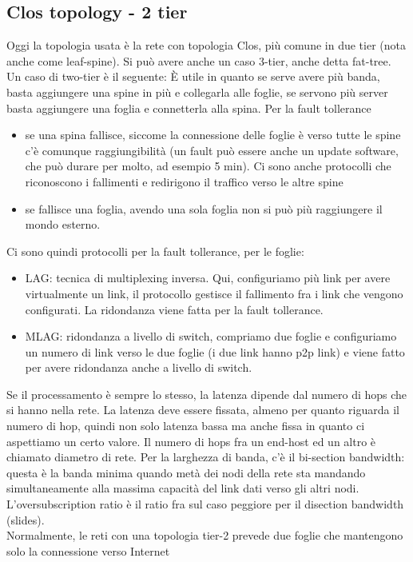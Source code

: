 \documentclass[12pt, oneside]{extbook} %
\begin{document}
\subsection{Clos topology - 2 tier}
Oggi la topologia usata è la rete con topologia Clos, più comune in due tier (nota anche come leaf-spine). Si può avere anche un caso 3-tier, anche detta fat-tree.\\Un caso di two-tier è il seguente:
È utile in quanto se serve avere più banda, basta aggiungere una spine in più e collegarla alle foglie, se servono più server basta aggiungere una foglia e connetterla alla spina. Per la fault tollerance
\begin{itemize}
\item se una spina fallisce, siccome la connessione delle foglie è verso tutte le spine c'è comunque raggiungibilità (un fault può essere anche un update software, che può durare per molto, ad esempio 5 min). Ci sono anche protocolli che riconoscono i fallimenti e redirigono il traffico verso le altre spine
\item se fallisce una foglia, avendo una sola foglia non si può più raggiungere il mondo esterno.
\end{itemize}
Ci sono quindi protocolli per la fault tollerance, per le foglie:
\begin{itemize}
\item LAG: tecnica di multiplexing inversa. Qui, configuriamo più link per avere virtualmente un link, il protocollo gestisce il fallimento fra i link che vengono configurati. La ridondanza viene fatta per la fault tollerance.
\item MLAG: ridondanza a livello di switch, compriamo due foglie e configuriamo un numero di link verso le due foglie (i due link hanno p2p link) e viene fatto per avere ridondanza anche a livello di switch.
\end{itemize}
Se il processamento è sempre lo stesso, la latenza dipende dal numero di hops che si hanno nella rete. La latenza deve essere fissata, almeno per quanto riguarda il numero di hop, quindi non solo latenza bassa ma anche fissa in quanto ci aspettiamo un certo valore. Il numero di hops fra un end-host ed un altro è chiamato diametro di rete. Per la larghezza di banda, c'è il bi-section bandwidth: questa è la banda minima quando metà dei nodi della rete sta mandando simultaneamente alla massima capacità del link dati verso gli altri nodi.\\L'oversubscription ratio è il ratio fra sul caso peggiore per il disection bandwidth (slides).\\Normalmente, le reti con una topologia tier-2 prevede due foglie che mantengono solo la connessione verso Internet
\end{document}
